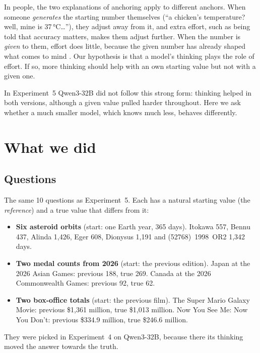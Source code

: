 \documentclass[11pt,a4paper]{article}
\begin{document}
In people, the two explanations of anchoring apply to different anchors. When someone \emph{generates} the starting number themselves (\enquote{a chicken's temperature? well, mine is 37\,°C\dots}), they adjust away from it, and extra effort, such as being told that accuracy matters, makes them adjust further. When the number is \emph{given} to them, effort does little, because the given number has already shaped what comes to mind \citep{epley2001putting,epley2005effortful}. Our hypothesis is that a model's thinking plays the role of effort. If so, more thinking should help with an own starting value but not with a given one.

In Experiment~5 Qwen3-32B did not follow this strong form: thinking helped in both versions, although a given value pulled harder throughout. Here we ask whether a much smaller model, which knows much less, behaves differently.

\section{What we did}

\subsection{Questions}
The same 10 questions as Experiment~5. Each has a natural starting value (the \emph{reference}) and a true value that differs from it:
\begin{itemize}[leftmargin=*]
  \item \textbf{Six asteroid orbits} (start: one Earth year, 365 days). Itokawa 557, Bennu 437, Alinda 1,426, Eger 608, Dionysus 1,191 and (52768)~1998~OR2 1,342 days.
  \item \textbf{Two medal counts from 2026} (start: the previous edition). Japan at the 2026 Asian Games: previous 188, true 269. Canada at the 2026 Commonwealth Games: previous 92, true 62.
  \item \textbf{Two box-office totals} (start: the previous film). The Super Mario Galaxy Movie: previous \$1,361 million, true \$1,013 million. Now You See Me: Now You Don't: previous \$334.9 million, true \$246.6 million.
\end{itemize}
They were picked in Experiment~4 on Qwen3-32B, because there its thinking moved the answer towards the truth.
\end{document}
